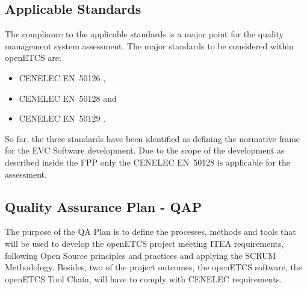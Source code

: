 \documentclass[openetcs]{template/openetcs_article}
\begin{document}
\subsection{Applicable Standards}
The compliance to the applicable standards is a major point for the quality management system assessment.
The major standards to be considered within openETCS are:
\begin{itemize}
\item CENELEC EN~50126 \cite{EN50126},
\item CENELEC EN~50128 \cite{EN50128} and
\item CENELEC EN~50129 \cite{EN50129}.
\end{itemize}

So far, the three standards have been identified as defining the normative frame for the EVC Software development. Due to the scope of the development as described inside the FPP \cite{FPP} only the CENELEC EN~50128 is applicable for the assessment.

\subsection{Quality Assurance Plan - QAP}
The purpose of the QA Plan is to define the processes, methods and tools that will be used to develop the openETCS project meeting ITEA requirements, following
Open Source principles and practices and applying the SCRUM Methodology. Besides, two of the project outcomes, the openETCS software, the openETCS Tool Chain,
will have to comply with CENELEC requirements.
\end{document}
